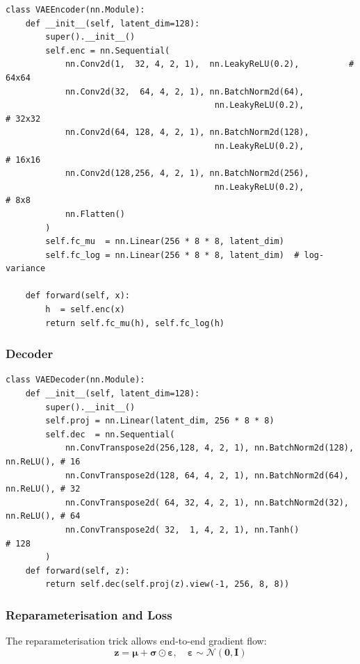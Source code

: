 \documentclass[12pt,a4paper]{article}
\begin{document}
\begin{lstlisting}[caption={VAE Encoder -- four strided convolution blocks}]
class VAEEncoder(nn.Module):
    def __init__(self, latent_dim=128):
        super().__init__()
        self.enc = nn.Sequential(
            nn.Conv2d(1,  32, 4, 2, 1),  nn.LeakyReLU(0.2),          # 64x64
            nn.Conv2d(32,  64, 4, 2, 1), nn.BatchNorm2d(64),
                                          nn.LeakyReLU(0.2),           # 32x32
            nn.Conv2d(64, 128, 4, 2, 1), nn.BatchNorm2d(128),
                                          nn.LeakyReLU(0.2),           # 16x16
            nn.Conv2d(128,256, 4, 2, 1), nn.BatchNorm2d(256),
                                          nn.LeakyReLU(0.2),           # 8x8
            nn.Flatten()
        )
        self.fc_mu  = nn.Linear(256 * 8 * 8, latent_dim)
        self.fc_log = nn.Linear(256 * 8 * 8, latent_dim)  # log-variance

    def forward(self, x):
        h  = self.enc(x)
        return self.fc_mu(h), self.fc_log(h)
\end{lstlisting}

\subsubsection{Decoder}

\begin{lstlisting}[caption={VAE Decoder -- four transposed convolution blocks}]
class VAEDecoder(nn.Module):
    def __init__(self, latent_dim=128):
        super().__init__()
        self.proj = nn.Linear(latent_dim, 256 * 8 * 8)
        self.dec  = nn.Sequential(
            nn.ConvTranspose2d(256,128, 4, 2, 1), nn.BatchNorm2d(128), nn.ReLU(), # 16
            nn.ConvTranspose2d(128, 64, 4, 2, 1), nn.BatchNorm2d(64),  nn.ReLU(), # 32
            nn.ConvTranspose2d( 64, 32, 4, 2, 1), nn.BatchNorm2d(32),  nn.ReLU(), # 64
            nn.ConvTranspose2d( 32,  1, 4, 2, 1), nn.Tanh()                       # 128
        )
    def forward(self, z):
        return self.dec(self.proj(z).view(-1, 256, 8, 8))
\end{lstlisting}

\subsubsection{Reparameterisation and Loss}

The reparameterisation trick allows end-to-end gradient flow:
\[
\mathbf{z} = \boldsymbol{\mu} + \boldsymbol{\sigma} \odot \boldsymbol{\varepsilon},
\quad \boldsymbol{\varepsilon} \sim \mathcal{N}(\mathbf{0},\mathbf{I})
\]
\end{document}
